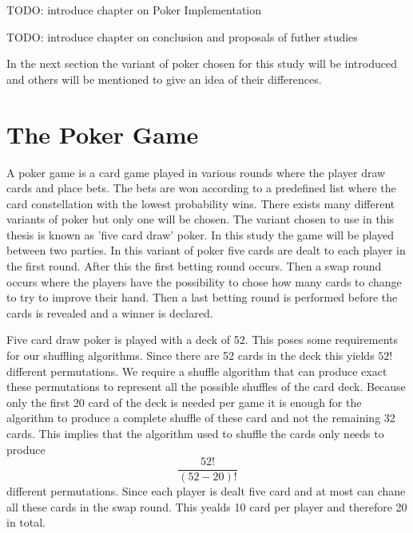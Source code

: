 \documentclass[twoside,11pt,openright]{report}
\newcommand{\todo}[1]{}
\renewcommand{\todo}[1]{{\color{red} TODO: {#1}} \\}
\begin{document}
\bigskip

\todo{introduce chapter on Poker Implementation}

\bigskip

\todo{introduce chapter on conclusion and proposals of futher studies}

\bigskip

In the next section the variant of poker chosen for this study will be introduced and others will be mentioned to give an idea of their differences.

\section{The Poker Game}
\label{sec:poker}
A poker game is a card game played in various rounds where the player draw cards and place bets. The bets are won according to a predefined list where the card constellation with the lowest probability wins. There exists many different variants of poker but only one will be chosen. The variant chosen to use in this thesis is known as 'five card draw' poker. In this study the game will be played between two parties. In this variant of poker five cards are dealt to each player in the first round. After this the first betting round occurs. Then a swap round occurs where the players have the possibility to chose how many cards to change to try to improve their hand. Then a last betting round is performed before the cards is revealed and a winner is declared.

Five card draw poker is played with a deck of 52. This poses some requirements for our shuffling algorithms. Since there are 52 cards in the deck this yields $52!$ different permutations. We require a shuffle algorithm that can produce exact these permutations to represent all the possible shuffles of the card deck. Because only the first 20 card of the deck is needed per game it is enough for the algorithm to produce a complete shuffle of these card and not the remaining 32 cards. This implies that the algorithm used to shuffle the cards only needs to produce $$\frac{52!}{(52-20)!}$$ different permutations. Since each player is dealt five card and at most can chane all these cards in the swap round. This yealds 10 card per player and therefore 20 in total.
\end{document}
